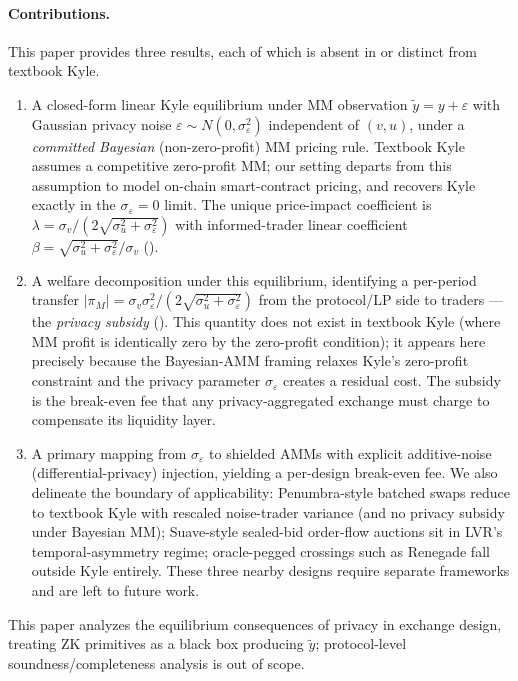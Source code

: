 \documentclass[runningheads]{llncs}
\newcommand{\sigv}{\sigma_v}
\newcommand{\sigu}{\sigma_u}
\newcommand{\sige}{\sigma_\varepsilon}
\newcommand{\ytil}{\tilde y}
\begin{document}
\paragraph{Contributions.}
This paper provides three results, each of which is absent in or
distinct from textbook Kyle.

\begin{enumerate}[leftmargin=*]
\item A closed-form linear Kyle equilibrium under MM observation
$\ytil = y + \varepsilon$ with Gaussian privacy noise
$\varepsilon \sim N(0, \sige^2)$ independent of $(v, u)$,
under a \emph{committed Bayesian} (non-zero-profit) MM pricing
rule. Textbook Kyle assumes a competitive zero-profit MM; our
setting departs from this assumption to model on-chain
smart-contract pricing, and recovers Kyle exactly in the
$\sige = 0$ limit. The unique price-impact coefficient is
$\lambda = \sigv / (2\sqrt{\sigu^2 + \sige^2})$ with
informed-trader linear coefficient
$\beta = \sqrt{\sigu^2 + \sige^2}/\sigv$
().

\item A welfare decomposition under this equilibrium, identifying a
per-period transfer
$|\pi_M| = \sigv \sige^2 / (2\sqrt{\sigu^2 + \sige^2})$
from the protocol/LP side to traders --- the \emph{privacy
subsidy} (). This quantity does not exist in
textbook Kyle (where MM profit is identically zero by the
zero-profit condition); it appears here precisely because the
Bayesian-AMM framing relaxes Kyle's zero-profit constraint and
the privacy parameter $\sige$ creates a residual cost. The
subsidy is the break-even fee that any privacy-aggregated
exchange must charge to compensate its liquidity layer.

\item A primary mapping from $\sige$ to shielded AMMs with
explicit additive-noise (differential-privacy) injection,
yielding a per-design break-even fee. We also delineate the
boundary of applicability: Penumbra-style batched swaps reduce
to textbook Kyle with rescaled noise-trader variance (and no
privacy subsidy under Bayesian MM); Suave-style sealed-bid
order-flow auctions sit in LVR's temporal-asymmetry regime;
oracle-pegged crossings such as Renegade fall outside Kyle
entirely. These three nearby designs require separate frameworks
and are left to future work.
\end{enumerate}

This paper analyzes the equilibrium consequences of privacy in
exchange design, treating ZK primitives as a black box producing
$\ytil$; protocol-level soundness/completeness analysis is out of
scope.
\end{document}

